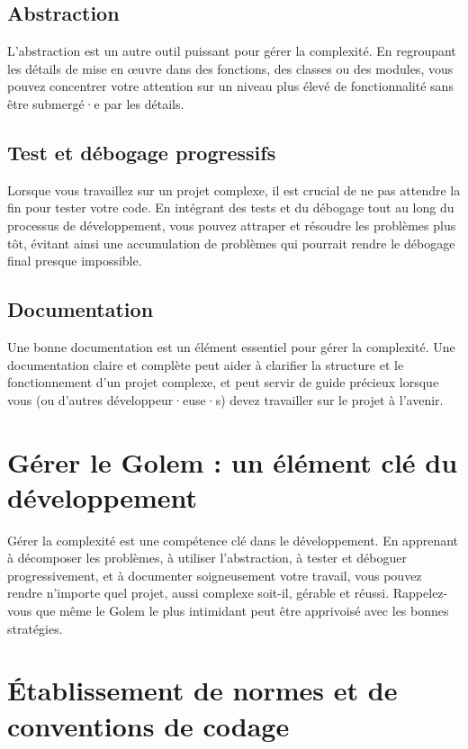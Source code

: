 \subsection{Abstraction}
L'abstraction est un autre outil puissant pour gérer la complexité. En regroupant les détails de mise en œuvre dans des fonctions, des classes ou des modules, vous pouvez concentrer votre attention sur un niveau plus élevé de fonctionnalité sans être submergé·e par les détails.

\subsection{Test et débogage progressifs}
Lorsque vous travaillez sur un projet complexe, il est crucial de ne pas attendre la fin pour tester votre code. En intégrant des tests et du débogage tout au long du processus de développement, vous pouvez attraper et résoudre les problèmes plus tôt, évitant ainsi une accumulation de problèmes qui pourrait rendre le débogage final presque impossible.

\subsection{Documentation}
Une bonne documentation est un élément essentiel pour gérer la complexité. Une documentation claire et complète peut aider à clarifier la structure et le fonctionnement d'un projet complexe, et peut servir de guide précieux lorsque vous (ou d'autres développeur·euse·s) devez travailler sur le projet à l'avenir.

\section{Gérer le Golem : un élément clé du développement}

Gérer la complexité est une compétence clé dans le développement. En apprenant à décomposer les problèmes, à utiliser l'abstraction, à tester et déboguer progressivement, et à documenter soigneusement votre travail, vous pouvez rendre n'importe quel projet, aussi complexe soit-il, gérable et réussi. Rappelez-vous que même le Golem le plus intimidant peut être apprivoisé avec les bonnes stratégies.

\section{Établissement de normes et de conventions de codage}

